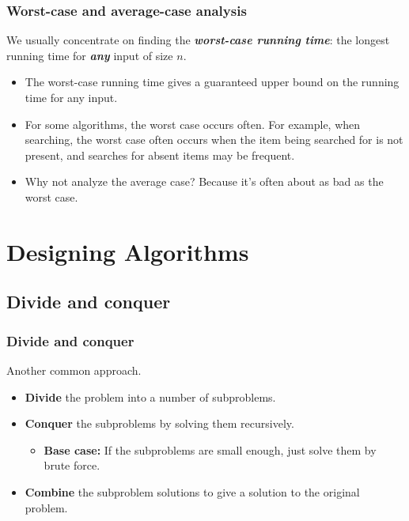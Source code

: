 \documentclass[notes,serif]{beamer}
\begin{document}
\begin{frame}
\frametitle{Worst-case and average-case analysis}
We usually concentrate on finding the {\bf \em worst-case running time}: the longest running
time for {\bf \em any} input of size $n$.
\begin{itemize}
  \item The worst-case running time gives a guaranteed upper bound on the running
time for any input.
  \item For some algorithms, the worst case occurs often. For example, when searching,
the worst case often occurs when the item being searched for is not present, and searches
for absent items may be frequent.
  \item Why not analyze the average case? Because it's often about as bad as the worst
case.
\end{itemize}
\end{frame}

\section{Designing Algorithms}

\subsection{Divide and conquer}
\begin{frame}
\frametitle{Divide and conquer}
Another common approach.
\begin{itemize}
    \item {\bf Divide} the problem into a number of subproblems.
    \item {\bf Conquer} the subproblems by solving them recursively.
    \begin{itemize}
    \item {\bf Base case:} If the subproblems are small enough, just solve them by brute force.
    \end{itemize}
    \item {\bf Combine} the subproblem solutions to give a solution to the original problem.
\end{itemize}
\end{frame}
\end{document}
